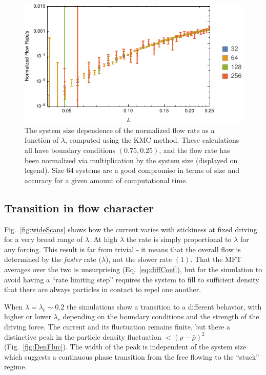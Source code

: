 \documentclass[
reprint, amsmath,amssymb,
]{revtex4-1}
\begin{document}
\begin{figure}[h!]
\vspace{0em}
\begin{center}
    \includegraphics[width=1\linewidth]{lambdaScanRepeatFlows}
\end{center}
\caption{\label{fig:sysScaling} The system size dependence of the normalized  flow rate as a function of $\lambda$, computed using the KMC method. These calculations all have boundary conditions $(0.75, 0.25)$, and the flow rate has been
normalized via multiplication by the system size (displayed on legend). Size
$64$ systems are a good compromise in terms of size and accuracy for a given amount of computational time.
}
\end{figure}

\subsection{Transition in flow character}

Fig.~\ref{fig:wideScans} shows how the current varies with stickiness
at fixed driving for a very broad range of $\lambda$.  At high $\lambda$ the rate is simply proportional
to $\lambda$ for any forcing.  This result is far from trivial - it
means that the overall flow is determined by the {\it faster} rate
$(\lambda$), not the slower rate $(1)$.  That the MFT averages over the
two is unsurprising (Eq.~\ref{eq:diffCoef}), but for the
simulation to avoid having a ``rate limiting step'' requires the
system to fill to sufficient density that there are always particles
in contact to repel one another.

When $\lambda = \lambda_c\sim0.2$ the simulations show a transition to a different
behavior, with higher or lower $\lambda_c$ depending on the boundary conditions and the strength of the driving force.
The current and its fluctuation remains finite, but there a distinctive peak in the particle density fluctuation
$<(\rho-\bar{\rho})^2$ (Fig.~\ref{fig:DenFluc}).  The width of the peak is independent of the
system size 
which suggests a continuous
phase transition from the free flowing to the ``stuck'' regime.
\end{document}

